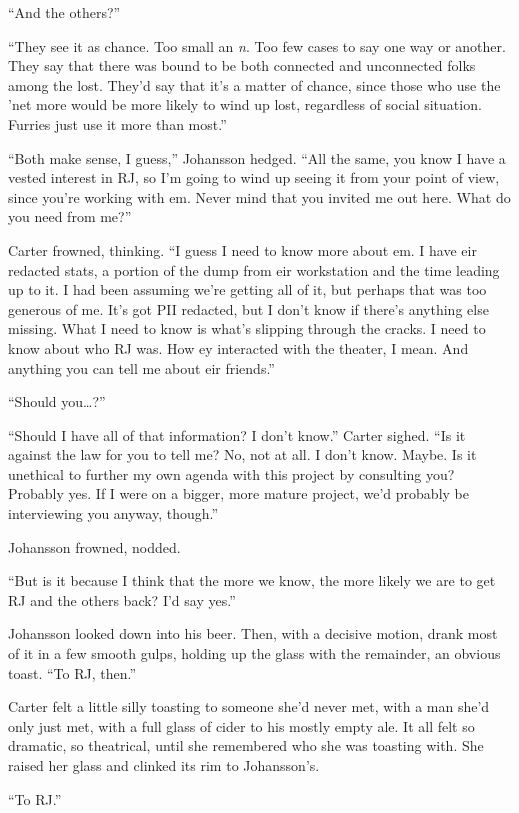 ``And the others?''

``They see it as chance. Too small an \emph{n}. Too few cases to say one way or another. They say that there was bound to be both connected and unconnected folks among the lost. They'd say that it's a matter of chance, since those who use the 'net more would be more likely to wind up lost, regardless of social situation. Furries just use it more than most.''

``Both make sense, I guess,'' Johansson hedged. ``All the same, you know I have a vested interest in RJ, so I'm going to wind up seeing it from your point of view, since you're working with em. Never mind that you invited me out here. What do you need from me?''

Carter frowned, thinking. ``I guess I need to know more about em. I have eir redacted stats, a portion of the dump from eir workstation and the time leading up to it. I had been assuming we're getting all of it, but perhaps that was too generous of me. It's got PII redacted, but I don't know if there's anything else missing. What I need to know is what's slipping through the cracks. I need to know about who RJ was. How ey interacted with the theater, I mean. And anything you can tell me about eir friends.''

``Should you\ldots{}?''

``Should I have all of that information? I don't know.'' Carter sighed. ``Is it against the law for you to tell me? No, not at all. I don't know. Maybe. Is it unethical to further my own agenda with this project by consulting you? Probably yes. If I were on a bigger, more mature project, we'd probably be interviewing you anyway, though.''

Johansson frowned, nodded.

``But is it because I think that the more we know, the more likely we are to get RJ and the others back? I'd say yes.''

Johansson looked down into his beer. Then, with a decisive motion, drank most of it in a few smooth gulps, holding up the glass with the remainder, an obvious toast. ``To RJ, then.''

Carter felt a little silly toasting to someone she'd never met, with a man she'd only just met, with a full glass of cider to his mostly empty ale. It all felt so dramatic, so theatrical, until she remembered who she was toasting with. She raised her glass and clinked its rim to Johansson's.

``To RJ.''
